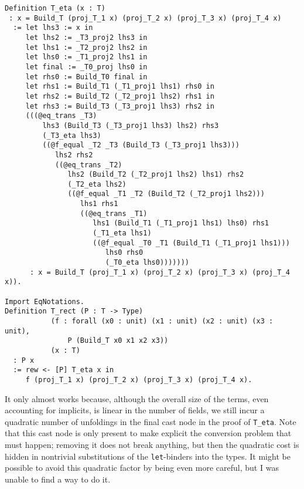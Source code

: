 \begin{verbatim}
Definition T_eta (x : T)
 : x = Build_T (proj_T_1 x) (proj_T_2 x) (proj_T_3 x) (proj_T_4 x)
  := let lhs3 := x in
     let lhs2 := _T3_proj2 lhs3 in
     let lhs1 := _T2_proj2 lhs2 in
     let lhs0 := _T1_proj2 lhs1 in
     let final := _T0_proj lhs0 in
     let rhs0 := Build_T0 final in
     let rhs1 := Build_T1 (_T1_proj1 lhs1) rhs0 in
     let rhs2 := Build_T2 (_T2_proj1 lhs2) rhs1 in
     let rhs3 := Build_T3 (_T3_proj1 lhs3) rhs2 in
     (((@eq_trans _T3)
         lhs3 (Build_T3 (_T3_proj1 lhs3) lhs2) rhs3
         (_T3_eta lhs3)
         ((@f_equal _T2 _T3 (Build_T3 (_T3_proj1 lhs3)))
            lhs2 rhs2
            ((@eq_trans _T2)
               lhs2 (Build_T2 (_T2_proj1 lhs2) lhs1) rhs2
               (_T2_eta lhs2)
               ((@f_equal _T1 _T2 (Build_T2 (_T2_proj1 lhs2)))
                  lhs1 rhs1
                  ((@eq_trans _T1)
                     lhs1 (Build_T1 (_T1_proj1 lhs1) lhs0) rhs1
                     (_T1_eta lhs1)
                     ((@f_equal _T0 _T1 (Build_T1 (_T1_proj1 lhs1)))
                        lhs0 rhs0
                        (_T0_eta lhs0)))))))
      : x = Build_T (proj_T_1 x) (proj_T_2 x) (proj_T_3 x) (proj_T_4 x)).

Import EqNotations.
Definition T_rect (P : T -> Type)
           (f : forall (x0 : unit) (x1 : unit) (x2 : unit) (x3 : unit),
               P (Build_T x0 x1 x2 x3))
           (x : T)
  : P x
  := rew <- [P] T_eta x in
     f (proj_T_1 x) (proj_T_2 x) (proj_T_3 x) (proj_T_4 x).
\end{verbatim}
  It only almost works because, although the overall size of the terms, even accounting for implicits, is linear in the number of fields, we still incur a quadratic number of unfoldings in the final cast node in the proof of \texttt{T_eta}.
  Note that this cast node is only present to make explicit the conversion problem that must happen; removing it does not break anything, but then the quadratic cost is hidden in nontrivial substitutions of the \texttt{let}-binders into the types.
  It might be possible to avoid this quadratic factor by being even more careful, but I was unable to find a way to do it.%
